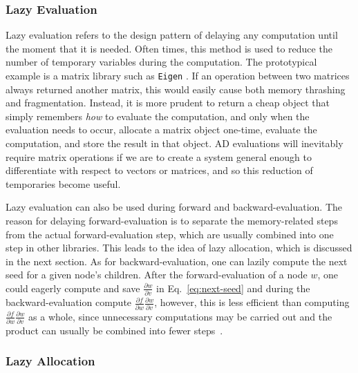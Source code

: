 \subsubsection{Lazy Evaluation}\label{sssec:lazy-eval}

Lazy evaluation refers to the design pattern of delaying any computation until the moment that it is needed.
Often times, this method is used to reduce the number of temporary variables during the computation.
The prototypical example is a matrix library such as \verb|Eigen| .
If an operation between two matrices always returned another matrix, 
this would easily cause both memory thrashing and fragmentation.
Instead, it is more prudent to return a cheap object that simply remembers \emph{how} to evaluate the computation,
and only when the evaluation needs to occur, allocate a matrix object one-time, 
evaluate the computation, and store the result in that object.
AD evaluations will inevitably require matrix operations if we are to create a system
general enough to differentiate with respect to vectors or matrices,
and so this reduction of temporaries become useful.

Lazy evaluation can also be used during forward and backward-evaluation.
The reason for delaying forward-evaluation is to separate
the memory-related steps from the actual forward-evaluation step,
which are usually combined into one step in other libraries.
This leads to the idea of lazy allocation, which is discussed in the next section.
As for backward-evaluation, one can lazily compute the next seed for a given node's children.
After the forward-evaluation of a node $w$, 
one could eagerly compute and save $\frac{\partial w}{\partial v}$
in Eq.~\ref{eq:next-seed} and during the backward-evaluation 
compute $\frac{\partial f}{\partial w} \frac{\partial w}{\partial v}$,
however, this is less efficient than 
computing $\frac{\partial f}{\partial w} \frac{\partial w}{\partial v}$ as a whole,
since unnecessary computations may be carried out
and the product can usually be combined into fewer steps~\cite{carpenter:2015}.

\subsubsection{Lazy Allocation}\label{sssec:lazy-alloc}

